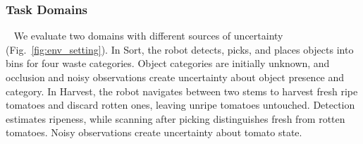 


\subsubsection{Task Domains}~\label{exp:setup_domains}
We evaluate two domains with different sources of uncertainty (Fig.~\ref{fig:env_setting}). In Sort, the robot detects, picks, and places objects into bins for four waste categories. Object categories are initially unknown, and occlusion and noisy observations create uncertainty about object presence and category. In Harvest, the robot navigates between two stems to harvest fresh ripe tomatoes and discard rotten ones, leaving unripe tomatoes untouched. Detection estimates ripeness, while scanning after picking distinguishes fresh from rotten tomatoes. Noisy observations create uncertainty about tomato state.



